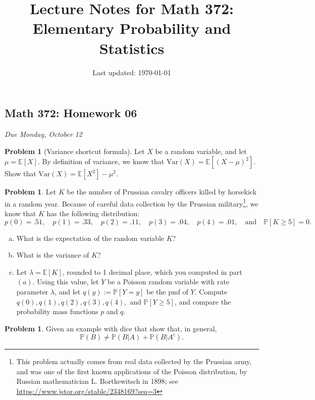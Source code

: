 \documentclass[10pt]{article}
\title{Lecture Notes for Math 372: \\Elementary Probability and Statistics}
\date{Last updated: \today}
\theoremstyle{definition}
\newtheorem{problem}[theorem]{Problem}
\newcommand{\1}[1]{\textbf{1}_{\left[#1\right]}} %
\def\E{\mathbb{E}} %
\def\P{\mathbb{P}} %
\def\Var{\mathrm{Var}} %
\begin{document}
\begin{center}
  \section*{Math 372: Homework 06}
  \textit{Due Monday, October 12}
\end{center}


\begin{problem}[Variance shortcut formula]
  Let $X$ be a random variable, and let $\mu= \E\left[X \right]$. By
  definition of variance, we know that
  $\Var(X) = \E\left[(X-\mu)^{2} \right]$. Show that
  $\Var(X) = \E\left[X^{2} \right] - \mu^{2}$.
\end{problem}

\begin{problem}  
  \label{ex:prussian-officers-killed-horsekick}
  Let $K$ be the number of Prussian cavalry officers killed by horsekick in a random year. Because of
  careful data collection by the Prussian military\footnote{This problem actually comes from real
    data collected by the Prussian army, and was one of the first known applications of the Poisson
    distribution, by Russian mathematician L. Bortkewitsch in 1898; see
    \url{https://www.jstor.org/stable/2348169?seq=3}}, we know that $K$ has the following distribution:
  \begin{equation*}
    p(0) = .51, \quad p(1) = .33, \quad p(2) = .11, \quad p(3) = .04, \quad p(4) = .01, \quad \text{and} \quad  \P\left[K \geq 5\right] =0.
  \end{equation*}
  
  \begin{enumerate}[(a)]
    \item What is the expectation of the random variable $K$? %
    \item What is the variance of $K$? %
    \item Let $\lambda= \E\left[K \right]$, rounded to 1 decimal place, which
    you computed in part $(a)$. Using this value, let $Y$ be a Poisson random
    variable with rate parameter $\lambda$, and let
    $q(y) := \P\left[Y=y \right]$ be the pmf of $Y$. Compute
    $q(0),q(1),q(2),q(3),q(4),$ and $\P\left[Y \geq 5\right]$, and compare the
    probability mass functions $p$ and $q$.
  \end{enumerate}
\end{problem}


\begin{problem}
  Given an example with dice that show that, in general,
  \begin{equation*}
    \P(B) \neq \P(B|A) + \P(B|A^{c}).
  \end{equation*}
\end{problem}
\end{document}
